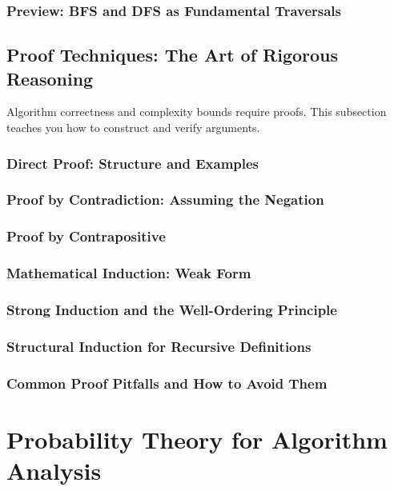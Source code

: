\subsubsection{Preview: BFS and DFS as Fundamental Traversals}

\subsection{Proof Techniques: The Art of Rigorous Reasoning}
\label{subsec:proof-techniques}

\begin{subsectionintro}
Algorithm correctness and complexity bounds require proofs.
This subsection teaches you how to construct and verify arguments.
\end{subsectionintro}

\subsubsection{Direct Proof: Structure and Examples}
\subsubsection{Proof by Contradiction: Assuming the Negation}
\subsubsection{Proof by Contrapositive}
\subsubsection{Mathematical Induction: Weak Form}
\subsubsection{Strong Induction and the Well-Ordering Principle}
\subsubsection{Structural Induction for Recursive Definitions}
\subsubsection{Common Proof Pitfalls and How to Avoid Them}

\section{Probability Theory for Algorithm Analysis}
\label{sec:probability}

